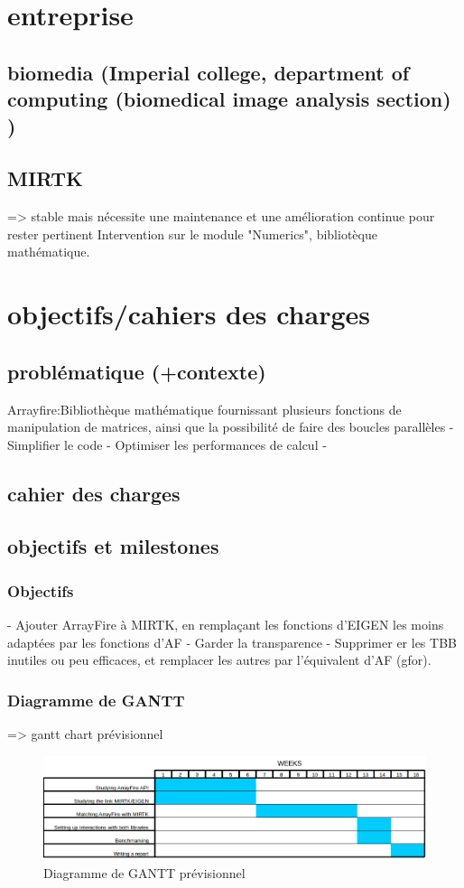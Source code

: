 \documentclass{report}
\begin{document}
\chapter{entreprise} 
	\section{biomedia (Imperial college, department of computing (biomedical image analysis section) )}
	\section{MIRTK}
	 => stable mais nécessite une maintenance et une amélioration continue pour rester pertinent
	 Intervention sur le module "Numerics", bibliotèque mathématique.
\chapter{ objectifs/cahiers des charges}
	\section{problématique (+contexte)}
	Arrayfire:Bibliothèque mathématique fournissant plusieurs fonctions de manipulation de matrices, ainsi que la possibilité de faire des boucles parallèles
	- Simplifier le code - Optimiser les performances de calcul -
	\section{cahier des charges}
	\section{objectifs et milestones}
	\subsection{Objectifs}- Ajouter ArrayFire à MIRTK, en remplaçant les fonctions d'EIGEN les moins adaptées par les fonctions d'AF
	- Garder la transparence
	- Supprimer er les TBB inutiles ou peu efficaces, et remplacer les autres par l'équivalent d'AF (gfor).
	\subsection{Diagramme de GANTT}
	 => gantt chart prévisionnel
	\begin{figure}[h!]
		\begin{center}
			\includegraphics[width=18cm]{Reports/figures/estimated_gantt.png}
		\end{center}	
		\caption{Diagramme de GANTT prévisionnel}
		\label{Diagramme de GANTT prévisionnel}
	\end{figure}
\end{document}
